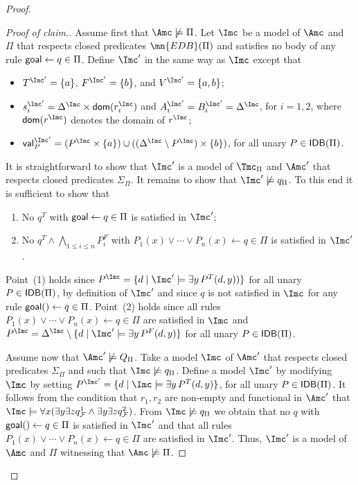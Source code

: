 \documentclass{lmcs}
\theoremstyle{definition}
\let\OriginalQedSymbol\qedsymbol
\renewcommand{\qedsymbol}{\OriginalQedSymbol\setcounter{claim}{0}}
\let\NormalQedSymbol\qedsymbol
\newenvironment{clmproof}[1]{\renewcommand{\qedsymbol}{$\dashv$}\begin{proof}[Proof of claim.]\space#1}{\end{proof}\renewcommand{\qedsymbol}{\NormalQedSymbol}}
\begin{document}
\begin{proof}
\begin{clmproof}
Assume first that $\Amc\not\models \Pi$. Let $\Imc$ be a model of
$\Amc$ and $\Pi$ that respects closed predicates $\mn{EDB}(\Pi)$ and
satisfies no body of any rule ${\sf goal}\leftarrow q\in \Pi$.  Define $\Imc'$ in the same
way as $\Imc$ except that 
\begin{itemize}
\item $T^{\Imc'}=\{a\}$, $F^{\Imc'}=\{b\}$, and $V^{\Imc'}=\{a,b\}$;
\item $s_{i}^{\Imc'} = \Delta^{\Imc}\times {\sf dom}(r_{i}^{\Imc})$ and $A_{i}^{\Imc'} = B_{i}^{\Imc'} = \Delta^{\Imc}$, for $i=1,2$,
where ${\sf dom}(r^{\Imc})$ denotes the domain of $r^{\Imc}$;
\item 
${\sf val}_{P}^{\Imc'} = (P^{\Imc} \times \{a\}) \cup ((\Delta^{\Imc}\setminus P^{\Imc}) \times \{b\})$, 
for all unary $P\in {\sf IDB}(\Pi)$.
\end{itemize}
It is straightforward to show that $\Imc'$ is a model of $\Tmc_{\Pi}$
and $\Amc'$ that respects closed predicates $\Sigma_{\Pi}$. It
remains to show that $\Imc'\not\models q_{\Pi}$.  To this end it is
sufficient to show that
\begin{enumerate}
\item No $q^{T}$ with ${\sf goal}\leftarrow q\in \Pi$ is satisfied in $\Imc'$;
\item No $q^{T}\wedge \bigwedge_{1\leq i \leq n} P_{i}^{F}$ with $P_{1}(x)\vee \cdots \vee P_{n}(x) \leftarrow q\in \Pi$
is satisfied in $\Imc'$.
\end{enumerate}
Point~(1) holds since $P^{\Imc}=\{ d \mid \Imc'\models \exists y \, P^{T}(d,y))\}$ for all unary $P\in {\sf IDB}(\Pi)$,
by definition of $\Imc'$ and since $q$ is not satisfied in $\Imc$ for any rule ${\sf goal}()\leftarrow q\in \Pi$. 
Point~(2) holds since all rules $P_{1}(x)\vee \cdots \vee P_{n}(x) \leftarrow q\in \Pi$ are satisfied in $\Imc$
and $P^{\Imc}= \Delta^{\Imc}\setminus\{ d \mid \Imc'\models \exists y\, P^{F}(d,y)\}$ for all unary $P\in {\sf IDB}(\Pi)$.

\medskip

Assume now that $\Amc'\not\models Q_{\Pi}$. Take a model
$\Imc$ of $\Amc'$ that respects closed predicates $\Sigma_{\Pi}$ and
such that $\Imc\not\models q_{\Pi}$. Define a model $\Imc'$ by modifying $\Imc$ by setting
$P^{\Imc'} = \{ d \mid \Imc\models \exists y\,P^{T}(d,y)\}$, for all unary $P\in {\sf IDB}(\Pi)$. It follows
from the condition that $r_{1},r_{2}$ are non-empty and
functional in $\Amc'$ that $\Imc\models \forall x (\exists y\exists z q_{\mathcal{F}}^{1} \wedge \exists y \exists z
q_{\mathcal{F}}^{2})$. 
From $\Imc\not\models q_{\Pi}$ we obtain that no $q$ with ${\sf goal}()\leftarrow q\in \Pi$ is satisfied
in $\Imc'$ and that all rules $P_{1}(x)\vee \cdots \vee P_{n}(x) \leftarrow q\in \Pi$ are satisfied in $\Imc'$.
Thus, $\Imc'$ is a model of $\Amc$ and $\Pi$ witnessing that $\Amc\not\models\Pi$.


\end{clmproof}
\end{proof}
\end{document}
